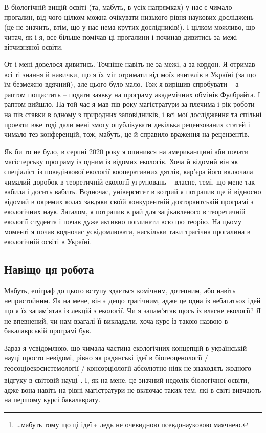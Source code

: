 \documentclass[
  11pt,
]{book}
\begin{document}
В біологічній вищій освіті (та, мабуть, в усіх напрямках) у нас є чимало прогалин, від чого цілком можна очікувати низького рівня наукових досліджень (це не значить, втім, що у нас нема крутих дослідників!). І цілком можливо, що читач, як і я, все більше помічав ці прогалини і починав дивитись за межі вітчизняної освіти.

От і мені довелося дивитись. Точніше навіть не за межі, а за кордон. Я отримав всі ті знання й навички, що я їх міг отримати від моїх вчителів в Україні (за що їм безмежно вдячний), але цього було мало. Тож я вирішив спробувати -- а раптом пощастить -- подати заявку на програму академічних обмінів Фулбрайта. І раптом вийшло. На той час я мав пів року магістратури за плечима і рік роботи на пів ставки в одному з природних заповідників, і всі мої дослідження та спільні проекти вже тоді дали мені змогу опублікувати декілька рецензованих статей і чимало тез конференцій, тож, мабуть, це й справило враження на рецензентів.

Як би то не було, в серпні 2020 року я опинився на американщині аби почати магістерську програму із одним із відомих екологів. Хоча й відомий він як спеціаліст із \href{https://youtu.be/yNjJW49qauY?si=iz2zCsNGr_RwuTLp}{поведінкової екології кооперативних дятлів}, кар'єра його включала чималий доробок в теоретичній екології угруповань -- власне, темі, що мене так вабила і досить вабить. Водночас, університет в котрий я потрапив ще й відносно відомий в окремих колах завдяки своїй конкурентній докторантській програмі з екологічних наук. Загалом, я потрапив в рай для зацікавленого в теоретичній екології студента і почав дуже активно поглинати всю цю теорію. На цьому моменті я почав водночас усвідомлювати, наскільки таки трагічна прогалина в екологічній освіті в Україні.

\subsection{Навіщо ця робота}\label{whythiswork}

Мабуть, епіграф до цього вступу здається комічним, дотепним, або навіть непристойним. Як на мене, він є дещо трагічним, адже це одна із небагатьох ідей що я їх запам'ятав із лекцій з екології. Чи я запам'ятав щось із власне екології? Я не впевнений, чи нам взагалі її викладали, хоча курс із такою назвою в бакалаврській програмі був.

Зараз я усвідомлюю, що чимала частина екологічних концепцій в українській науці просто невідомі, рівно як радянські ідеї в біогеоценології / геосоціоекосистемології / консорціології абсолютно ніяк не знаходять жодного відгуку в світовій науці\footnote{\ldots мабуть тому що ці ідеї є ледь не очевидною псевдонауковою маячнею.}. І, як на мене, це значний недолік біологічної освіти, адже вона навіть на рівні магістратури не включає таких тем, які в світі вивчають на першому курсі бакалаврату.
\end{document}
